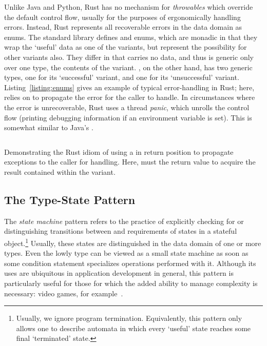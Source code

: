 Unlike Java and Python, Rust has no mechanism for \textit{throwables} which override the default control flow, usually for the purposes of ergonomically handling errors. Instead, Rust represents all recoverable errors in the data domain as enums. The standard library defines  and  enums, which are monadic in that they wrap the `useful' data as one of the variants, but represent the possibility for other variants also. They differ in that  carries no data, and thus  is generic only over one type, the contents of the  variant. , on the other hand, has two generic types, one for its `successful'  variant, and one for its `unsuccessful'  variant. Listing~\ref{listing:enums} gives an example of typical error-handling in Rust; here,  relies on  to propagate the error for the caller to handle. In circumstances where the error is unrecoverable, Rust uses a thread \textit{panic}, which unrolls the control flow (printing debugging information if an environment variable is set). This is somewhat similar to Java's .

\begin{listing}[ht]
	\centering
	\inputminted[]{rust}{enums.rs}
	\caption[TODO.]{Demonstrating the Rust idiom of using a  in return position to propagate exceptions to the caller for handling. Here,  must  the return value to acquire the result contained within the  variant.}
	\label{listing:enums}
\end{listing}

\subsection{The Type-State Pattern}
\label{sec:type_state}

The \textit{state machine} pattern refers to the practice of explicitly checking for or distinguishing transitions between and requirements of states in a stateful object.\footnote{Usually, we ignore program termination. Equivalently, this pattern only allows one to describe automata in which every `useful' state reaches some final `terminated' state.} Usually, these states are distinguished in the data domain of one or more types. Even the lowly  type can be viewed as a small state machine as soon as some condition statement specializes operations performed with it. Although its uses are ubiquitous in application development in general, this pattern is particularly useful for those for which the added ability to manage complexity is necessary: video games, for example~\cite{nystrom2014game}.

